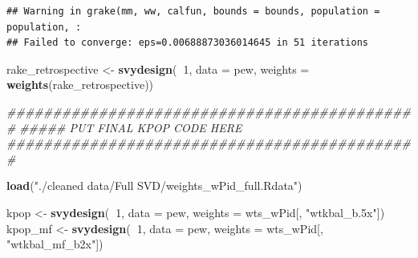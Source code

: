 \documentclass[
]{article}
\newenvironment{Shaded}{\begin{snugshade}}{\end{snugshade}}
\newcommand{\CommentTok}[1]{\textcolor[rgb]{0.56,0.35,0.01}{\textit{#1}}}
\newcommand{\DataTypeTok}[1]{\textcolor[rgb]{0.13,0.29,0.53}{#1}}
\newcommand{\DecValTok}[1]{\textcolor[rgb]{0.00,0.00,0.81}{#1}}
\newcommand{\KeywordTok}[1]{\textcolor[rgb]{0.13,0.29,0.53}{\textbf{#1}}}
\newcommand{\NormalTok}[1]{#1}
\newcommand{\OperatorTok}[1]{\textcolor[rgb]{0.81,0.36,0.00}{\textbf{#1}}}
\newcommand{\StringTok}[1]{\textcolor[rgb]{0.31,0.60,0.02}{#1}}
\begin{document}
\begin{verbatim}
## Warning in grake(mm, ww, calfun, bounds = bounds, population = population, :
## Failed to converge: eps=0.00688873036014645 in 51 iterations
\end{verbatim}

\begin{Shaded}
\begin{Highlighting}[]
\NormalTok{rake_retrospective <-}\StringTok{ }\KeywordTok{svydesign}\NormalTok{(}\OperatorTok{~}\DecValTok{1}\NormalTok{, }\DataTypeTok{data =}\NormalTok{ pew, }\DataTypeTok{weights =} \KeywordTok{weights}\NormalTok{(rake_retrospective))}
\end{Highlighting}
\end{Shaded}

\begin{Shaded}
\begin{Highlighting}[]
\CommentTok{#############################################}
\CommentTok{##### PUT FINAL KPOP CODE HERE}
\CommentTok{#############################################}

\KeywordTok{load}\NormalTok{(}\StringTok{"./cleaned data/Full SVD/weights_wPid_full.Rdata"}\NormalTok{)}

\NormalTok{kpop <-}\StringTok{ }\KeywordTok{svydesign}\NormalTok{(}\OperatorTok{~}\DecValTok{1}\NormalTok{, }\DataTypeTok{data =}\NormalTok{ pew, }\DataTypeTok{weights =}\NormalTok{ wts_wPid[, }\StringTok{"wtkbal_b.5x"}\NormalTok{])}
\NormalTok{kpop_mf <-}\StringTok{ }\KeywordTok{svydesign}\NormalTok{(}\OperatorTok{~}\DecValTok{1}\NormalTok{, }\DataTypeTok{data =}\NormalTok{ pew, }\DataTypeTok{weights =}\NormalTok{ wts_wPid[, }\StringTok{"wtkbal_mf_b2x"}\NormalTok{])}
\end{Highlighting}
\end{Shaded}
\end{document}
